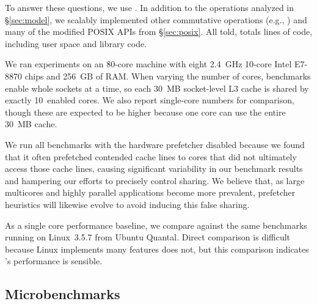 To answer these questions, we use \sys.
In addition to the operations analyzed in \S\ref{sec:model}, we scalably implemented
other commutative operations (e.g., )
and many of the modified POSIX APIs from
\S\ref{sec:posix}.
%
All told, \sys
totals  lines of code, including user
space and library code.

We ran experiments on an 80-core machine with eight 2.4~GHz 10-core
Intel E7-8870 chips and 256~GB of RAM.  When varying the number of
cores, benchmarks enable whole sockets at a time, so each 30~MB
socket-level L3 cache is shared by exactly 10~enabled cores.
We also report single-core numbers for
comparison, though these are expected to be higher because one
core can use the entire 30~MB cache.

We run all benchmarks with the hardware prefetcher disabled because we
found that it often prefetched contended cache lines to cores that did
not ultimately access those cache lines, causing significant
variability in our benchmark results and hampering our efforts to
precisely control sharing.  We believe that, as large multicores and
highly parallel applications become more prevalent, prefetcher
heuristics will likewise evolve to avoid inducing this false sharing.

As a single core performance baseline, we compare against the same
benchmarks running on Linux~3.5.7 from Ubuntu Quantal.  Direct
comparison is difficult because
Linux implements many features \sys does not, but this comparison
indicates \sys's performance is sensible.

\subsection{Microbenchmarks}
\label{sec:eval:microbenchmarks}


